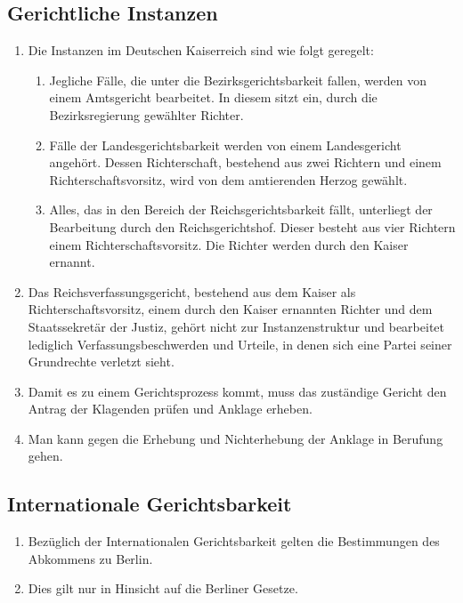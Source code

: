 \documentclass{article}
\begin{document}
\subsection{Gerichtliche Instanzen}
\begin{enumerate}[(1)]
    \item Die Instanzen im Deutschen Kaiserreich sind wie folgt geregelt:
    \begin{enumerate}[1.]
        \item Jegliche Fälle, die unter die Bezirksgerichtsbarkeit fallen, werden von einem Amtsgericht bearbeitet. In diesem sitzt ein, durch die Bezirksregierung gewählter Richter.
        \item Fälle der Landesgerichtsbarkeit werden von einem Landesgericht angehört. Dessen Richterschaft, bestehend aus zwei Richtern und einem Richterschaftsvorsitz, wird von dem amtierenden Herzog gewählt.
        \item Alles, das in den Bereich der Reichsgerichtsbarkeit fällt, unterliegt der Bearbeitung durch den Reichsgerichtshof. Dieser besteht aus vier Richtern einem Richterschaftsvorsitz. Die Richter werden durch den Kaiser ernannt.
    \end{enumerate}
    \item Das Reichsverfassungsgericht, bestehend aus dem Kaiser als Richterschaftsvorsitz, einem durch den Kaiser ernannten Richter und dem Staatssekretär der Justiz, gehört nicht zur Instanzenstruktur und
    bearbeitet lediglich Verfassungsbeschwerden und Urteile, in denen sich eine Partei seiner Grundrechte verletzt sieht.
    \item Damit es zu einem Gerichtsprozess kommt, muss das zuständige Gericht den Antrag der Klagenden prüfen und Anklage erheben.
    \item Man kann gegen die Erhebung und Nichterhebung der Anklage in Berufung gehen.
\end{enumerate}

\subsection{Internationale Gerichtsbarkeit}
\begin{enumerate}[(1)]
    \item Bezüglich der Internationalen Gerichtsbarkeit gelten die Bestimmungen des Abkommens zu Berlin.
    \item Dies gilt nur in Hinsicht auf die Berliner Gesetze.
\end{enumerate}
\end{document}
